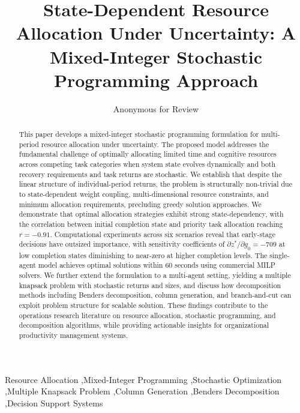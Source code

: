 \documentclass[preprint,review,11pt]{elsarticle}
\begin{document}
\begin{frontmatter}

\title{State-Dependent Resource Allocation Under Uncertainty: A Mixed-Integer Stochastic Programming Approach}


\author{Anonymous for Review}


\begin{abstract}
This paper develops a mixed-integer stochastic programming formulation for multi-period resource allocation under uncertainty. The proposed model addresses the fundamental challenge of optimally allocating limited time and cognitive resources across competing task categories when system state evolves dynamically and both recovery requirements and task returns are stochastic. We establish that despite the linear structure of individual-period returns, the problem is structurally non-trivial due to state-dependent weight coupling, multi-dimensional resource constraints, and minimum allocation requirements, precluding greedy solution approaches. We demonstrate that optimal allocation strategies exhibit strong state-dependency, with the correlation between initial completion state and priority task allocation reaching $r = -0.91$. Computational experiments across six scenarios reveal that early-stage decisions have outsized importance, with sensitivity coefficients of $\partial z^*/\partial g_0 = -709$ at low completion states diminishing to near-zero at higher completion levels. The single-agent model achieves optimal solutions within 60 seconds using commercial MILP solvers. We further extend the formulation to a multi-agent setting, yielding a multiple knapsack problem with stochastic returns and sizes, and discuss how decomposition methods including Benders decomposition, column generation, and branch-and-cut can exploit problem structure for scalable solution. These findings contribute to the operations research literature on resource allocation, stochastic programming, and decomposition algorithms, while providing actionable insights for organizational productivity management systems.
\end{abstract}

\begin{keyword}
Resource Allocation \sep Mixed-Integer Programming \sep Stochastic Optimization \sep Multiple Knapsack Problem \sep Column Generation \sep Benders Decomposition \sep Decision Support Systems
\end{keyword}

\end{frontmatter}
\end{document}

